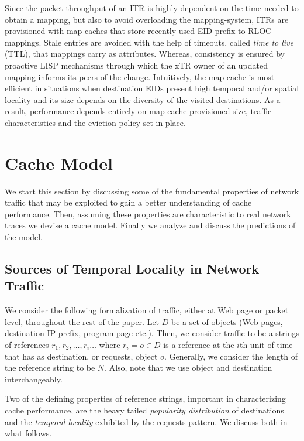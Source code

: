 \documentclass[twocolumn, 10pt]{article}
\theoremstyle{plain}
\begin{document}
Since the packet throughput of an ITR is highly dependent on the time needed
to obtain a mapping, but also to avoid overloading the mapping-system, ITRs
are provisioned with map-caches that store recently used EID-prefix-to-RLOC
mappings. Stale entries are avoided with the help of timeouts, called
\emph{time to live} (TTL), that mappings carry as attributes. Whereas,
consistency is ensured by proactive LISP mechanisms through which the xTR
owner of an updated mapping informs its peers of the change.  Intuitively, the
map-cache is most efficient in situations when destination EIDs present high
temporal and/or spatial locality and its size depends on the diversity of the
visited destinations. As a result, performance depends entirely on map-cache
provisioned size, traffic characteristics and the eviction policy set in
place. 



 
\section{Cache Model}\label{sec:cache_model}
We start this section by discussing some of the fundamental properties of network traffic
that may be exploited to gain a better understanding of cache performance. Then,
assuming these properties are characteristic to real network traces we devise a
cache model. Finally we analyze and discuss the predictions of the model. 

\subsection{Sources of Temporal Locality in Network Traffic}\label{sec:temp_locality}

We consider the following formalization of traffic, either at Web page or
packet level, throughout the rest of the paper. Let $D$ be a set of objects
(Web pages, destination IP-prefix, program page etc.). Then, we consider 
traffic to be a strings of references $r_1, r_2, \dots, r_i\dots$ where
$r_i = o \in D$ is a reference at the $i$th unit of time that 
has as destination, or requests, object $o$. Generally, we consider the length
of the reference string to be $N$. Also, note that we use object
and destination interchangeably. 

Two of the defining properties of reference strings, important in
characterizing cache performance, are the heavy tailed \emph{popularity
distribution} of destinations and the \emph{temporal locality} exhibited by
the requests pattern. We discuss both in what follows.  
\end{document}

